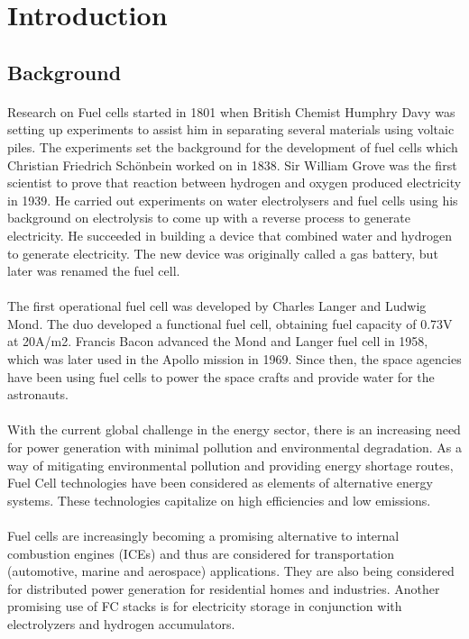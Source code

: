 \section{Introduction}
\label{sec:introduction}
\subsection{Background}
\paragraph{}Research on Fuel cells started in 1801 when British Chemist Humphry Davy was setting up experiments to assist him in separating several materials using voltaic piles. The experiments set the background for the development of fuel cells which Christian Friedrich Schönbein worked on in 1838. Sir William Grove was the first scientist to prove that reaction between hydrogen and oxygen produced electricity in 1939. He carried out experiments on water electrolysers and fuel cells using his background on electrolysis to come up with a reverse process to generate electricity. He succeeded in building a device that combined water and hydrogen to generate electricity. The new device was originally called a gas battery, but later was renamed the fuel cell.
\paragraph{}The first operational fuel cell was developed by Charles Langer and Ludwig Mond. The duo developed a functional fuel cell, obtaining fuel capacity of 0.73V at 20A/m2. Francis Bacon advanced the Mond and Langer fuel cell in 1958, which was later used in the Apollo mission in 1969. Since then, the space agencies have been using fuel cells to power the space crafts and provide water for the astronauts.
\paragraph{}With the current global challenge in the energy sector, there is an increasing need for power generation with minimal pollution and environmental degradation. As a way of mitigating environmental pollution and providing energy shortage routes, Fuel Cell technologies have been considered as elements of alternative energy systems. These technologies capitalize on high efficiencies and low emissions.
\paragraph{}Fuel cells are increasingly becoming a promising alternative to internal combustion engines (ICEs) and thus are considered for transportation (automotive, marine and aerospace) applications. They are also being considered for distributed power generation for residential homes and industries. Another promising use of FC stacks is for electricity storage in conjunction with electrolyzers and hydrogen accumulators. 
